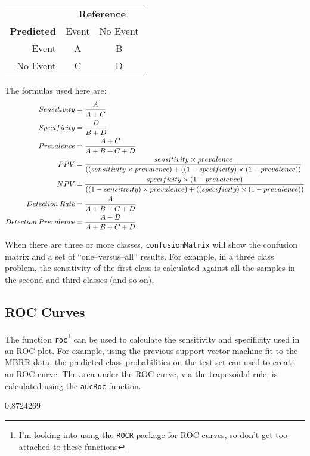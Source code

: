 \documentclass[12pt]{article}
\begin{document}
\begin{tabular}{r|c|c|}
                    & \multicolumn{2}{c}{{\bf Reference}}          \\
\cline{2-3}
         {\bf Predicted}  & Event     & No Event \\
\cline{2-3}
         Event      & A         & B        \\
\cline{2-3}
         No Event   & C         & D      \\
\cline{2-3}  
\end{tabular}

The formulas used here are:
\begin{align}
Sensitivity &= \frac{A}{A+C}\notag \\
Specificity &= \frac{D}{B+D}\notag \\
Prevalence &= \frac{A+C}{A+B+C+D}\notag \\
PPV &= \frac{sensitivity \times prevalence}{((sensitivity \times prevalence) + ((1-specificity) \times(1-prevalence))}\notag \\
NPV &= \frac{specificity \times (1-prevalence)}{((1-sensitivity) \times prevalence) + ((specificity) \times(1-prevalence))}\notag \\
Detection\: Rate &=  \frac{A}{A+B+C+D}\notag \\
Detection\: Prevalence &=  \frac{A + B}{A+B+C+D}\notag 
\end{align}

When there are three or more classes, \texttt{confusionMatrix} will show the confusion matrix and a set of ``one--versus--all'' results. For example, in a three class problem, the sensitivity of the first class is calculated against all the samples in the second and third classes (and so on).


\subsection*{ROC Curves}

The function \texttt{roc}\footnote{I'm looking into using the \texttt{ROCR} package for ROC curves, so don't get too attached to these functions} can be used to calculate the sensitivity and specificity used in an ROC plot. For example, using the previous support vector machine fit to the MBRR data, the predicted class probabilities on the test set can used to create an ROC curve. The area under the ROC curve, via the trapezoidal rule, is calculated using the \texttt{aucRoc} function. 

\begin{small}
\begin{Schunk}
\begin{Soutput}
[1] 0.8724269
\end{Soutput}
\end{Schunk}
\end{small}
\end{document}
